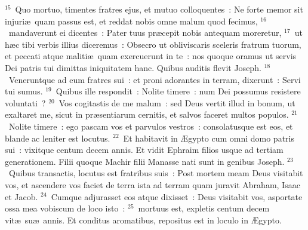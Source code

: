 ${}^{15}$~Quo mortuo, timentes fratres ejus, et mutuo colloquentes~: Ne forte memor sit injuri\ae\ quam passus est, et reddat nobis omne malum quod fecimus,
${}^{16}$~mandaverunt ei dicentes~: Pater tuus pr\ae cepit nobis antequam moreretur,
${}^{17}$~ut h\ae c tibi verbis illius diceremus~: Obsecro ut obliviscaris sceleris fratrum tuorum, et peccati atque maliti\ae\ quam exercuerunt in te~: nos quoque oramus ut servis Dei patris tui dimittas iniquitatem hanc. Quibus auditis flevit Joseph.
${}^{18}$~Veneruntque ad eum fratres sui~: et proni adorantes in terram, dixerunt~: Servi tui sumus.
${}^{19}$~Quibus ille respondit~: Nolite timere~: num Dei possumus resistere voluntati~?
${}^{20}$~Vos cogitastis de me malum~: sed Deus vertit illud in bonum, ut exaltaret me, sicut in pr\ae sentiarum cernitis, et salvos faceret multos populos.
${}^{21}$~Nolite timere~: ego pascam vos et parvulos vestros~: consolatusque est eos, et blande ac leniter est locutus.
${}^{22}$~Et habitavit in \AE gypto cum omni domo patris sui~: vixitque centum decem annis. Et vidit Ephraim filios usque ad tertiam generationem. Filii quoque Machir filii Manasse nati sunt in genibus Joseph.
${}^{23}$~Quibus transactis, locutus est fratribus suis~: Post mortem meam Deus visitabit vos, et ascendere vos faciet de terra ista ad terram quam juravit Abraham, Isaac et Jacob.
${}^{24}$~Cumque adjurasset eos atque dixisset~: Deus visitabit vos, asportate ossa mea vobiscum de loco isto~:
${}^{25}$~mortuus est, expletis centum decem vit\ae\ su\ae\ annis. Et conditus aromatibus, repositus est in loculo in \AE gypto.
